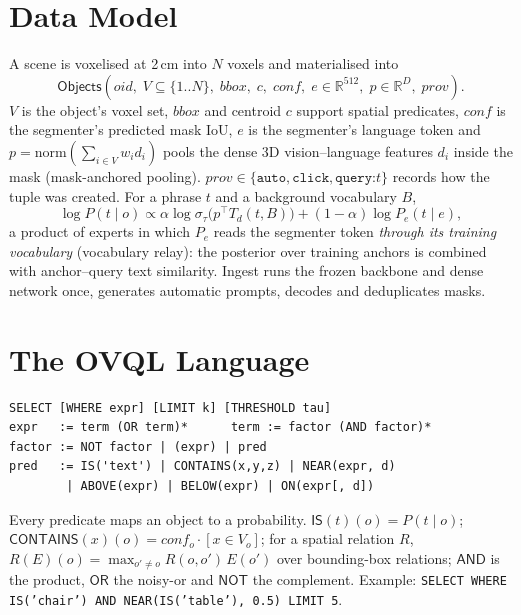 \documentclass[conference]{IEEEtran}
\newcommand{\ovql}{\textsc{OVQL}}
\begin{document}
\section{Data Model}\label{sec:model}
A scene is voxelised at 2\,cm into $N$ voxels and materialised into
\[
\textsf{Objects}(oid,\; V\subseteq\{1..N\},\; bbox,\; c,\; conf,\; e\in\mathbb{R}^{512},\; p\in\mathbb{R}^{D},\; prov).
\]
$V$ is the object's voxel set, $bbox$ and centroid $c$ support spatial predicates, $conf$ is the segmenter's predicted
mask IoU, $e$ is the segmenter's language token and $p=\mathrm{norm}(\sum_{i\in V} w_i d_i)$ pools the dense 3D
vision--language features $d_i$ inside the mask (mask-anchored pooling). $prov\in\{\texttt{auto},\texttt{click},
\texttt{query:}t\}$ records how the tuple was created. For a phrase $t$ and a background vocabulary $B$,
\[
\log P(t\mid o) \propto \alpha \log \sigma_\tau\!\big(p^\top T_d(t,B)\big) + (1-\alpha)\log P_{e}(t\mid e),
\]
a product of experts in which $P_e$ reads the segmenter token \emph{through its training vocabulary} (vocabulary
relay): the posterior over training anchors is combined with anchor--query text similarity. Ingest runs the frozen
backbone and dense network once, generates automatic prompts, decodes and deduplicates masks.

\section{The \ovql{} Language}\label{sec:lang}
\begin{lstlisting}
SELECT [WHERE expr] [LIMIT k] [THRESHOLD tau]
expr   := term (OR term)*      term := factor (AND factor)*
factor := NOT factor | (expr) | pred
pred   := IS('text') | CONTAINS(x,y,z) | NEAR(expr, d)
        | ABOVE(expr) | BELOW(expr) | ON(expr[, d])
\end{lstlisting}
Every predicate maps an object to a probability. $\textsf{IS}(t)(o)=P(t\mid o)$;
$\textsf{CONTAINS}(x)(o)=conf_o\cdot[x\in V_o]$; for a spatial relation $R$,
$R(E)(o)=\max_{o'\neq o} R(o,o')\,E(o')$ over bounding-box relations; $\textsf{AND}$ is the product, $\textsf{OR}$ the
noisy-or and $\textsf{NOT}$ the complement. Example:
\texttt{SELECT WHERE IS('chair') AND NEAR(IS('table'), 0.5) LIMIT 5}.
\end{document}
